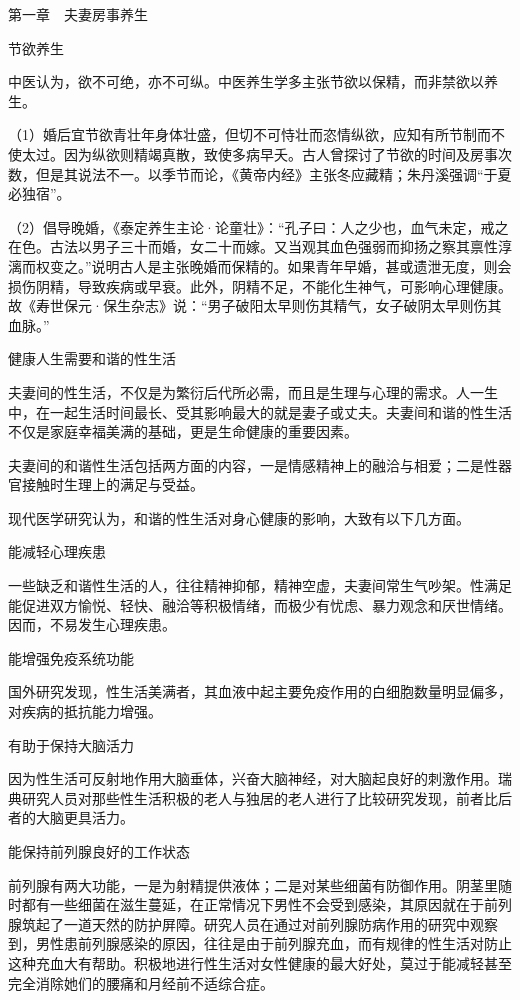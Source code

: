\documentclass[12pt,UTF8]{ctexbook}
\begin{document}
第一章　夫妻房事养生


节欲养生


中医认为，欲不可绝，亦不可纵。中医养生学多主张节欲以保精，而非禁欲以养生。

（1）婚后宜节欲青壮年身体壮盛，但切不可恃壮而恣情纵欲，应知有所节制而不使太过。因为纵欲则精竭真散，致使多病早夭。古人曾探讨了节欲的时间及房事次数，但是其说法不一。以季节而论，《黄帝内经》主张冬应藏精；朱丹溪强调“于夏必独宿”。

（2）倡导晚婚，《泰定养生主论·论童壮》：“孔子曰：人之少也，血气未定，戒之在色。古法以男子三十而婚，女二十而嫁。又当观其血色强弱而抑扬之察其禀性淳漓而权变之。”说明古人是主张晚婚而保精的。如果青年早婚，甚或遗泄无度，则会损伤阴精，导致疾病或早衰。此外，阴精不足，不能化生神气，可影响心理健康。故《寿世保元·保生杂志》说：“男子破阳太早则伤其精气，女子破阴太早则伤其血脉。”





健康人生需要和谐的性生活


夫妻间的性生活，不仅是为繁衍后代所必需，而且是生理与心理的需求。人一生中，在一起生活时间最长、受其影响最大的就是妻子或丈夫。夫妻间和谐的性生活不仅是家庭幸福美满的基础，更是生命健康的重要因素。

夫妻间的和谐性生活包括两方面的内容，一是情感精神上的融洽与相爱；二是性器官接触时生理上的满足与受益。

现代医学研究认为，和谐的性生活对身心健康的影响，大致有以下几方面。

能减轻心理疾患

一些缺乏和谐性生活的人，往往精神抑郁，精神空虚，夫妻间常生气吵架。性满足能促进双方愉悦、轻快、融洽等积极情绪，而极少有忧虑、暴力观念和厌世情绪。因而，不易发生心理疾患。

能增强免疫系统功能

国外研究发现，性生活美满者，其血液中起主要免疫作用的白细胞数量明显偏多，对疾病的抵抗能力增强。

有助于保持大脑活力

因为性生活可反射地作用大脑垂体，兴奋大脑神经，对大脑起良好的刺激作用。瑞典研究人员对那些性生活积极的老人与独居的老人进行了比较研究发现，前者比后者的大脑更具活力。

能保持前列腺良好的工作状态

前列腺有两大功能，一是为射精提供液体；二是对某些细菌有防御作用。阴茎里随时都有一些细菌在滋生蔓延，在正常情况下男性不会受到感染，其原因就在于前列腺筑起了一道天然的防护屏障。研究人员在通过对前列腺防病作用的研究中观察到，男性患前列腺感染的原因，往往是由于前列腺充血，而有规律的性生活对防止这种充血大有帮助。积极地进行性生活对女性健康的最大好处，莫过于能减轻甚至完全消除她们的腰痛和月经前不适综合症。
\end{document}
